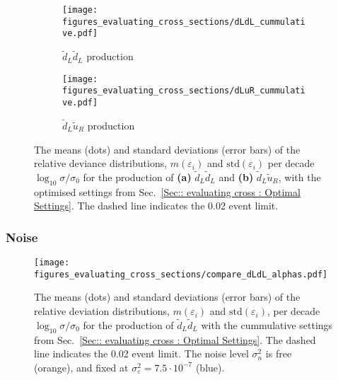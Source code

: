 \documentclass[twoside,english]{uiofysmaster}
\begin{document}
{{\begin{figure}
    \centering
    \begin{subfigure}[b]{0.8\textwidth}
        \texttt{[image: figures\_evaluating\_cross\_sections/dLdL\_cummulative.pdf]}
        \caption{$\widetilde{d}_L \widetilde{d}_L$ production}
        \label{Fig:: evaluating cross : RD cummulative dLdL}
    \end{subfigure}
    \begin{subfigure}[b]{0.8\textwidth}
        \texttt{[image: figures\_evaluating\_cross\_sections/dLuR\_cummulative.pdf]}
        \caption{$\widetilde{d}_L \widetilde{u}_R$ production}
        \label{Fig:: evaluating cross : RD cummulative dLuR}
    \end{subfigure}
    \caption[Relative deviance distributions for the optimal GP estimator]{The means (dots) and standard deviations (error bars) of the relative deviance distributions, $m(\varepsilon_i)$ and $\mathrm{std}(\varepsilon_i)$ per decade $ \log_{10} \sigma/\sigma_0$ for the production of \textbf{(a)} $\widetilde{d}_L \widetilde{d}_L$ and \textbf{(b)} $\widetilde{d}_L \widetilde{u}_R$, with the optimised settings from Sec.~\ref{Sec:: evaluating cross : Optimal Settings}. The dashed line indicates the 0.02 event limit.}
\label{Fig:: evaluating cross : RD cummulative dLdL dLuR}
\end{figure}


\subsubsection{Noise}

\begin{figure}
\centering
\texttt{[image: figures\_evaluating\_cross\_sections/compare\_dLdL\_alphas.pdf]}
\caption[Relative deviance distributions for GP estimators with free and fixed noise]{The means (dots) and standard deviations (error bars) of the relative deviation distributions, $m(\varepsilon_i)$ and $\mathrm{std}(\varepsilon_i)$, per decade $\log_{10} \sigma /\sigma_0$ for the production of $\widetilde{d}_L \widetilde{d}_L$ with the cummulative settings from Sec.~\ref{Sec:: evaluating cross : Optimal Settings}. The dashed line indicates the 0.02 event limit. The noise level $\sigma_n^2$ is free (orange), and fixed at $\sigma_{\varepsilon}^2=7.5 \cdot 10^{-7}$ (blue).}
\label{Fig:: evaluating cross : errors distribution alpha vs no alpha optimal}
\end{figure}



}}
\end{document}

